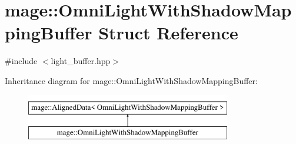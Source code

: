 \hypertarget{structmage_1_1_omni_light_with_shadow_mapping_buffer}{}\section{mage\+:\+:Omni\+Light\+With\+Shadow\+Mapping\+Buffer Struct Reference}
\label{structmage_1_1_omni_light_with_shadow_mapping_buffer}


{\ttfamily \#include $<$light\+\_\+buffer.\+hpp$>$}

Inheritance diagram for mage\+:\+:Omni\+Light\+With\+Shadow\+Mapping\+Buffer\+:\begin{figure}[H]
\begin{center}
\leavevmode
\includegraphics[height=2.000000cm]{structmage_1_1_omni_light_with_shadow_mapping_buffer}
\end{center}
\end{figure}
